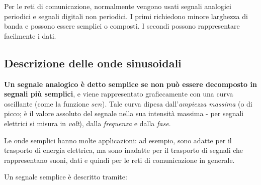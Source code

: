         \vspace{3mm}
        
        Per le reti di comunicazione, normalmente vengono usati segnali analogici periodici e segnali digitali non periodici. I primi richiedono minore larghezza di banda e possono essere semplici o composti. I secondi possono rappresentare facilmente i dati.
    
    \subsection{Descrizione delle onde sinusoidali}
    
        \textbf{Un segnale analogico è detto semplice se non può essere decomposto in segnali più semplici}, e viene rappresentato graficcamente con una curva oscillante (come la funzione \(sen\)). Tale curva dipesa dall'\textit{ampiezza massima} (o di picco; è il valore assoluto del segnale nella sua intensità massima - per segnali elettrici si misura in \textit{volt}), dalla \textit{frequenza} e dalla \textit{fase}.
        
        \vspace{3mm}
        
        Le onde semplici hanno molte applicazioni: ad esempio, sono adatte per il trasporto di energia elettrica, ma sono inadatte per il trasporto di segnali che rappresentano suoni, dati e quindi per le reti di comunicazione in generale.
        
        \vspace{3mm}
        
        Un segnale semplice è descritto tramite:
        
